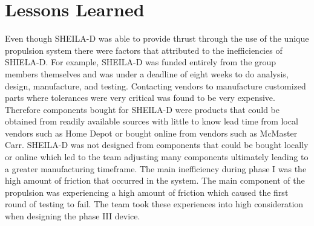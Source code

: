 \documentclass{report}
\begin{document}
\section{Lessons Learned}
Even though SHEILA-D was able to provide thrust through the use of the unique propulsion system there were factors that attributed to the inefficiencies of SHIELA-D. For example, SHEILA-D was funded entirely from the group members themselves and was under a deadline of eight weeks to do analysis, design, manufacture, and testing. Contacting vendors to manufacture customized parts where tolerances were very critical was found to be very expensive.  Therefore components bought for SHEILA-D were products that could be obtained from readily available sources with little to know lead time from local vendors such as Home Depot or bought online from vendors such as McMaster Carr. SHEILA-D was not designed from components that could be bought locally or online which led to the team adjusting many components ultimately leading to a greater manufacturing timeframe. The main inefficiency during phase I was the high amount of friction that occurred in the system. The main component of the propulsion was experiencing a high amount of friction which caused the first round of testing to fail. The team took these experiences into high consideration when designing the phase III device.\par
\end{document}

